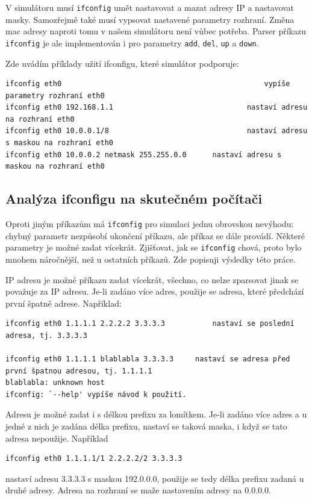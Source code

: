 V simulátoru musí \verb|ifconfig| umět nastavovat a mazat adresy IP a nastavovat masky. Samozřejmě také musí vypsovat nastavené parametry rozhraní. Změna mac adresy naproti tomu v našem simulátoru není vůbec potřeba. Parser příkazu \verb|ifconfig| je ale implementován i pro parametry \verb|add|, \verb|del|, \verb|up| a \verb|down|.

Zde uvádím příklady užití ifconfigu, které simulátor podporuje:
\begin{verbatim}
ifconfig eth0												vypíše parametry rozhraní eth0
ifconfig eth0 192.168.1.1								nastaví adresu na rozhraní eth0 
ifconfig eth0 10.0.0.1/8								nastaví adresu s maskou na rozhraní eth0
ifconfig eth0 10.0.0.2 netmask 255.255.0.0		nastaví adresu s maskou na rozhraní eth0
\end{verbatim}


\subsection{Analýza ifconfigu na skutečném počítači}\label{ifconfig_analysa}

Oproti jiným příkazům má \verb|ifconfig| pro simulaci jednu obrovskou nevýhodu: chybný parametr nezpůsobí ukončení příkazu, ale příkaz se dále provádí. Některé parametry je možné zadat vícekrát. Zjišťovat, jak se \verb|ifconfig| chová, proto bylo mnohem náročnější, než u ostatních příkazů. Zde popisuji výsledky této práce.

IP adresu je možné příkazu zadat vícekrát, všechno, co nelze zparsovat jinak se považuje za IP adresu. Je-li zadáno více adres, použije se adresa, které předchází první špatně adrese. Například:
\begin{verbatim}
ifconfig eth0 1.1.1.1 2.2.2.2 3.3.3.3			nastaví se poslední adresa, tj. 3.3.3.3

ifconfig eth0 1.1.1.1 blablabla 3.3.3.3		nastaví se adresa před první špatnou adresou, tj. 1.1.1.1
blablabla: unknown host
ifconfig: `--help' vypíše návod k použití.
\end{verbatim}
Adresu je možné zadat i s délkou prefixu za lomítkem. Je-li zadáno více adres a u jedné z nich je zadána délka prefixu, nastaví se taková maska, i když se tato adresa nepoužije. Například
\begin{verbatim}ifconfig eth0 1.1.1.1/1 2.2.2.2/2 3.3.3.3\end{verbatim}
nastaví adresu 3.3.3.3 s maskou 192.0.0.0, použije se tedy délka prefixu zadaná u druhé adresy. Adresa na rozhraní se maže nastavením adresy na 0.0.0.0.

